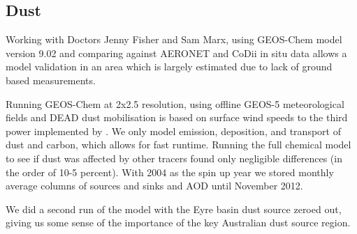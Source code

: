 
\subsection{Dust}
Working with Doctors Jenny Fisher and Sam Marx, using GEOS-Chem model version 9.02 and comparing against AERONET and CoDii in situ data allows a model validation in an area which is largely estimated due to lack of ground based measurements.

Running GEOS-Chem at 2x2.5 resolution, using offline GEOS-5 meteorological fields and DEAD dust mobilisation is based on surface wind speeds to the third power implemented by \citet{Duncan_Fairlie_2007}. We only model emission, deposition, and transport of dust and carbon, which allows for fast runtime. Running the full chemical model to see if dust was affected by other tracers found only negligible differences (in the order of 10-5 percent). With 2004 as the spin up year we stored monthly average columns of sources and sinks and AOD until November 2012.

We did a second run of the model with the Eyre basin dust source zeroed out, giving us some sense of the importance of the key Australian dust source region.
  